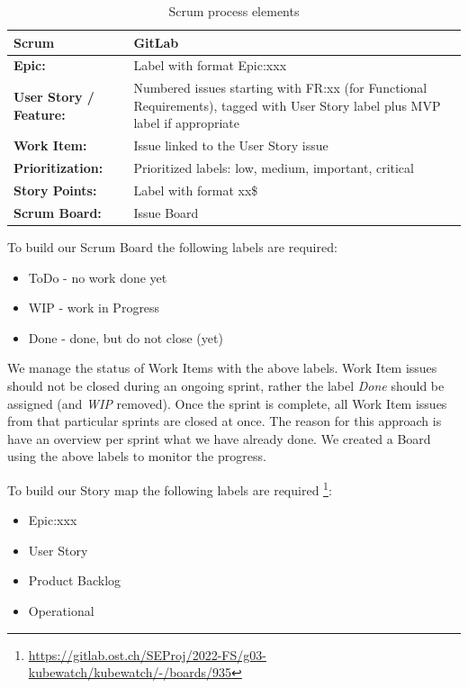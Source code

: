 \begin{table}
    \centering
    \caption{Scrum process elements}
    \label{tab:scrum-elements}
    \begin{tabular*}{\textwidth}{ p{5cm} | p{9cm} }
        \textbf{Scrum} & \textbf{GitLab} \\ 
        \hline
        \textbf{Epic:} & Label with format Epic:xxx \\
        \textbf{User Story / Feature:} & Numbered issues starting with FR:xx (for Functional Requirements), tagged with User Story label plus MVP label if appropriate \\
        \textbf{Work Item:} & Issue linked to the User Story issue \\
        \textbf{Prioritization:} & Prioritized labels: low, medium, important, critical \\
        \textbf{Story Points:} & Label with format xx\$ \\
        \textbf{Scrum Board:} & Issue Board \\
    \end{tabular*}
\end{table}

\noindent To build our Scrum Board the following labels are required:

\begin{itemize}
\item ToDo - no work done yet
\item WIP - work in Progress
\item Done - done, but do not close (yet)
\end{itemize}

\noindent We manage the status of Work Items with the above labels. Work Item issues should not be closed during an ongoing sprint, rather the label \textsl{Done} should be assigned (and \textsl{WIP} removed). Once the sprint is complete, all Work Item issues from that particular sprints are closed at once. The reason for this approach is have an overview per sprint what we have already done. We created a Board using the above labels to monitor the progress.

\noindent To build our Story map the following labels are required \footnote{\url{https://gitlab.ost.ch/SEProj/2022-FS/g03-kubewatch/kubewatch/-/boards/935}}:

\begin{itemize}
\item Epic:xxx
\item User Story
\item Product Backlog
\item Operational
\end{itemize}

